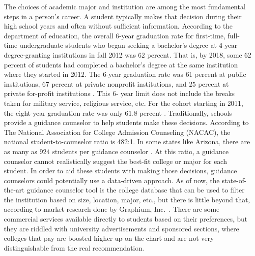\documentclass[conference]{IEEEtran}
\begin{document}
The choices of academic major and institution are among the most fundamental steps in a person’s career. A student typically makes that decision during their high school years and often without sufficient information. According to the department of education, the overall 6-year graduation rate for first-time, full-time undergraduate students who began seeking a bachelor’s degree at 4-year degree-granting institutions in fall 2012 was 62 percent. That is, by 2018, some 62 percent of students had completed a bachelor’s degree at the same institution where they started in 2012. The 6-year graduation rate was 61 percent at public institutions, 67 percent at private nonprofit institutions, and 25 percent at private for-profit institutions \cite{hussar2020condition}. This 6- year limit does not include the breaks taken for military service, religious service, etc. For the cohort starting in 2011, the eight-year graduation rate was only 61.8 percent \cite{nscr}.
Traditionally, schools provide a guidance counselor to help students make these decisions. According to The National Association for College Admission Counseling (NACAC), the national student-to-counselor ratio is 482:1. In some states like Arizona, there are as many as 924 students per guidance counselor \cite{american2015state}. At this ratio, a guidance counselor cannot realistically suggest the best-fit college or major for each student. In order to aid these students with making those decisions, guidance counselors could potentially use a data-driven approach. As of now, the state-of-the-art guidance counselor tool is the college database that can be used to filter the institution based on size, location, major, etc., but there is little beyond that, according to market research done by Graphium, Inc.~\cite{ghimire2019graphium}. There are some commercial services available directly to students based on their preferences, but
they are riddled with university advertisements and sponsored sections, where colleges that pay are boosted higher up on the chart and are not very distinguishable from the real recommendation.

\end{document}
